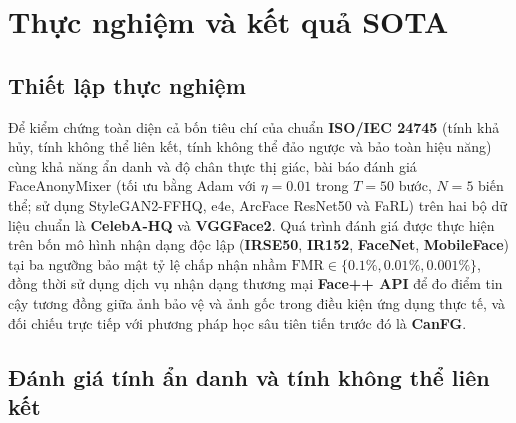 \section{Thực nghiệm và kết quả SOTA}
\label{sec::thuc-nghiem}

\subsection*{Thiết lập thực nghiệm}
Để kiểm chứng toàn diện cả bốn tiêu chí của chuẩn \textbf{ISO/IEC 24745} (tính khả hủy, tính không thể liên kết, tính không thể đảo ngược và bảo toàn hiệu năng) cùng khả năng ẩn danh và độ chân thực thị giác, bài báo đánh giá FaceAnonyMixer (tối ưu bằng Adam với $\eta = 0.01$ trong $T = 50$ bước, $N = 5$ biến thể; sử dụng StyleGAN2-FFHQ, e4e, ArcFace ResNet50 và FaRL) trên hai bộ dữ liệu chuẩn là \textbf{CelebA-HQ} và \textbf{VGGFace2}. Quá trình đánh giá được thực hiện trên bốn mô hình nhận dạng độc lập (\textbf{IRSE50}, \textbf{IR152}, \textbf{FaceNet}, \textbf{MobileFace}) tại ba ngưỡng bảo mật tỷ lệ chấp nhận nhầm $\text{FMR} \in \{0.1\%, 0.01\%, 0.001\%\}$, đồng thời sử dụng dịch vụ nhận dạng thương mại \textbf{Face++ API} để đo điểm tin cậy tương đồng giữa ảnh bảo vệ và ảnh gốc trong điều kiện ứng dụng thực tế, và đối chiếu trực tiếp với phương pháp học sâu tiên tiến trước đó là \textbf{CanFG}.

\subsection*{Đánh giá tính ẩn danh và tính không thể liên kết}

